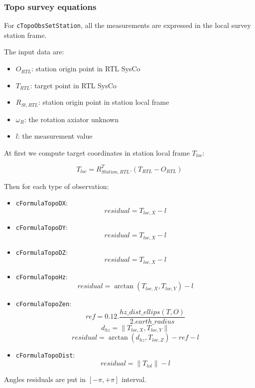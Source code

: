 \subsubsection{Topo survey equations}

For \texttt{cTopoObsSetStation}, all the measurements are expressed in the local survey station frame.

The input data are:

 \begin{itemize}
    \item $O_{RTL}$: station origin point in RTL SysCo
    \item $T_{RTL}$: target point in RTL SysCo
    \item $R_{St, RTL}$: station origin point in station local frame
    \item $\omega_R$: the rotation axiator unknown
    \item $l$: the measurement value
 \end{itemize}

 At first we compute target coordinates in station local frame $T_{loc}$:

 $$  T_{loc} = R_{Station, RTL}^T . (T_{RTL} - O_{RTL})  $$

 Then for each type of observation:
 
 \begin{itemize}
    \item {\tt cFormulaTopoDX}: $$ residual = T_{loc,X} - l$$
    \item {\tt cFormulaTopoDY}: $$ residual = T_{loc,X} - l$$
    \item {\tt cFormulaTopoDZ}: $$ residual = T_{loc,X} - l$$

    \item {\tt cFormulaTopoHz}: $$ residual =  \arctan\left(T_{loc,X}, T_{loc,Y}\right) - l $$
    \item {\tt cFormulaTopoZen}:
    $$ ref = 0.12 . \frac { hz\_dist\_ellips\left( T, O \right) }
                          { 2 . earth\_radius} $$
    $$ d_{hz} =  \| T_{loc,X}, T_{loc,Y} \| $$
    $$ residual =  \arctan\left(d_{hz}, T_{loc,Z}\right) - ref - l $$
    \item {\tt cFormulaTopoDist}: $$  residual =  \| T_{lol} \| - l $$

 \end{itemize}

 Angles residuals are put in $ [ -\pi, + \pi ] $ interval.




